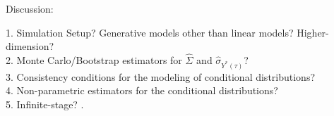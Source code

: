 \documentclass[12pt]{article}
\newcommand{\wh}{\widehat}
\begin{document}
Discussion:

1.  Simulation Setup? Generative models other than linear models? Higher-dimension? \\

2. Monte Carlo/Bootstrap estimators for $\wh{\Sigma}$ and $\wh{\sigma}_{Y^*(\tau)}$?\\

3. Consistency conditions for the  modeling of conditional distributions? \\

4. Non-parametric estimators for the conditional distributions? \\

5. Infinite-stage?
. 

%
%
\printbibliography
\end{document}
